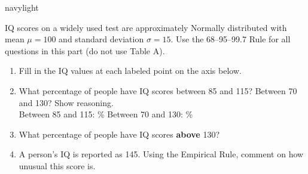 \documentclass[10pt]{article}
\begin{document}
\begin{blurbbox}{navylight}
\small

IQ scores on a widely used test are approximately Normally distributed with
mean $\mu = 100$ and standard deviation $\sigma = 15$. Use the
68--95--99.7 Rule for all questions in this part (do not use Table A).

\vspace{0.10in}

\begin{enumerate}[leftmargin=1.5em, itemsep=8pt]

  \item Fill in the IQ values at each labeled point on the axis below.\\[6pt]
        \begin{center}
        \end{center}

  \item What percentage of people have IQ scores between 85 and 115?
        Between 70 and 130? Show reasoning.\\[5pt]
        Between 85 and 115: \blank{2cm}\% \quad Between 70 and 130: \blank{2cm}\%

  \item What percentage of people have IQ scores \textbf{above} 130?\\[5pt]
        \writeline

  \item A person's IQ is reported as 145. Using the Empirical Rule, comment on how
        unusual this score is.\\[5pt]
        \writeline\\[1pt]\writeline

\end{enumerate}

\end{blurbbox}
\end{document}
